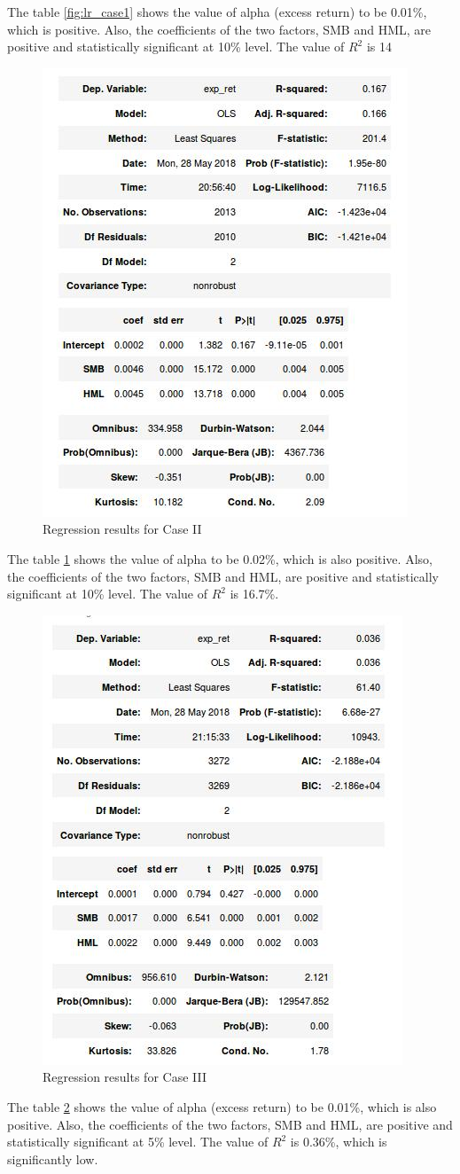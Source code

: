 The table \ref{fig:lr_case1} shows the value of alpha (excess return) to be 0.01\%, which is positive. Also, the coefficients of the two factors, SMB and HML, are positive and statistically significant at 10\% level. The value of $R^2$ is 14\
\begin{figure}[h!] 
\centering
 \includegraphics[width=0.75\linewidth]{figures/regression_llf10.jpeg}
\caption{Regression results for Case II}
\label{fig:lr_case2}
\end{figure} 
The table \ref{fig:lr_case2} shows the value of alpha to be 0.02\%, which is also positive. Also, the coefficients of the two factors, SMB and HML, are positive and statistically significant at 10\% level. The value of $R^2$ is 16.7\%.

\begin{figure}[h!] 
\centering
 \includegraphics[width=0.75\linewidth]{figures/regression_llf5.jpeg}
\caption{Regression results for Case III}
\label{fig:lr_case3}
\end{figure} 

The table \ref{fig:lr_case3} shows the value of alpha (excess return) to be 0.01\%, which is also positive. Also, the coefficients of the two factors, SMB and HML, are positive and statistically significant at 5\% level. The value of $R^2$ is 0.36\%, which is significantly low.
